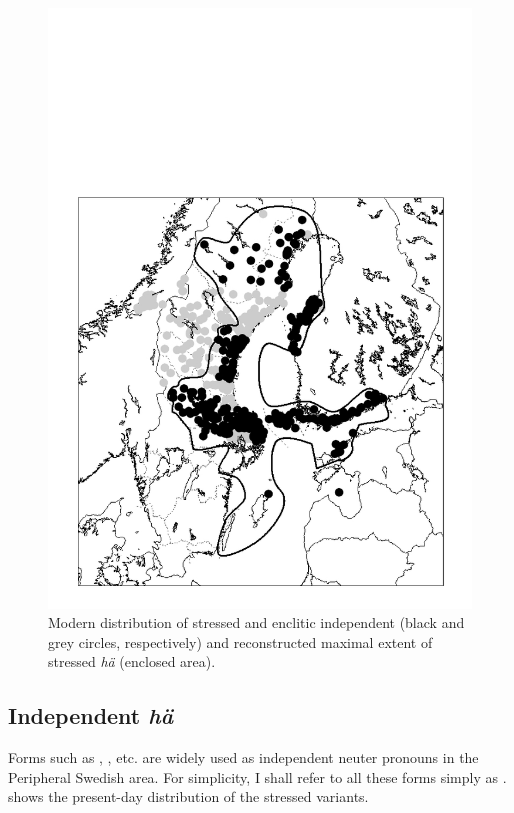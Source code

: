 \begin{figure} 
\includegraphics[height=.5\textheight]{figures/29_StressedandEnclitic}
\caption{Modern distribution of stressed and enclitic independent  (black and grey circles, respectively) and reconstructed maximal extent of stressed \textit{hä} (enclosed area).}
\label{map:25}  
\end{figure}

\subsection{Independent \textit{hä}}

Forms such as , , etc. are widely used as independent neuter pronouns in the Peripheral Swedish area. For simplicity, I shall refer to all these forms simply as .  shows the present-day distribution of the stressed variants. 

